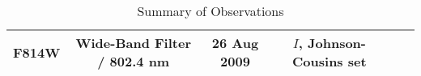 \documentclass[11pt,fleqn]{book} %
\begin{document}
\begin{table}[h]
\begin{tabular}{ c c c c c c }
																																																																																																																																																																																    F814W & Wide-Band Filter / 802.4 nm & 26 Aug 2009 & $I$, Johnson-Cousins set\\
																																																																																																																																																																																        \hline
																																																																																																																																																																																	  \end{tabular}
																																																																																																																																																																																	    \caption{Summary of Observations}
																																																																																																																																																																																	      \label{tab:uno}
																																																																																																																																																																																	      \end{table}
\end{document}

